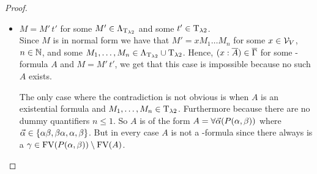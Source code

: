 \begin{proof}
\begin{itemize}
	\item[] \underline{$M=M'\,t'$} for some $M'\in\Lambda_{\text{T}_{\lambda2}}$ and some $t'\in\text{T}_{\lambda2}$.\\
		Since $M$ is in normal form we have that $M'=xM_1\dots M_n$ for some $x\in\mathcal{V}_V$, $n\in\mathbb{N}$, and some $M_1,\dots,M_n\in\Lambda_{\text{T}_{\lambda2}}\cup\text{T}_{\lambda2}$.
		Hence, $(x:\overline{A})\in\overline{\Gamma}$ for some \SysP-formula $A$ and $M=M'\,t'$, we get that this case is impossible because no such $A$ exists.
		
		The only case where the contradiction is not obvious is when $A$ is an existential formula and $M_1,\dots,M_n\in\text{T}_{\lambda2}$. Furthermore because there are no dummy quantifiers $n\leq1$. So $A$ is of the form $A=\forall\predVec(P(\predFst,\predSnd))$ where $\predVec\in\{\predFst\predSnd,\predSnd\predFst,\predFst,\predSnd\}$.
		But in every case $A$ is not a \SysP-formula since there always is a $\gamma\in\FV(P(\predFst,\predSnd))\setminus\FV(A)$.
		
\end{itemize}
\end{proof}

